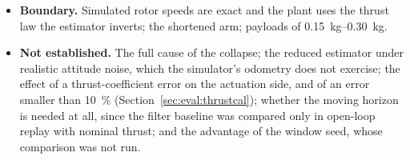 \begin{spacing}{1.5}
\begin{itemize}
estimate spent a median \SI{22}{\percent} of the loaded figure-eight below half
the payload and the reduced estimate none, in any flight. The median solve time
fell from \SI{2.8}{\milli\second} to \SI{0.3}{\milli\second}. Tracking and the
lifecycle did not change. In replay on the $48$ reduced-estimator flights, the
extended Kalman filter came within \SI{0.2}{\gram} of the reduced estimator's loaded
mass error, converging \SI{0.5}{\second} later after lift-off and
\SI{0.4}{\second} sooner after detachment; the window force balance was
\SIrange{0.5}{1.6}{\gram} less accurate. Penalising the newest measurement, which
the flown estimator leaves without cost, shortened its convergence by
\SIrange{0.2}{0.3}{\second} at unchanged accuracy, and replacing the body-origin
velocity by the composite-centre velocity changed nothing
(Section~\ref{sec:eval:reduced}).
\item \textbf{Boundary.} Simulated rotor speeds are exact and the plant uses the
thrust law the estimator inverts; the shortened arm; payloads of
\SIrange{0.15}{0.30}{\kg}.
\item \textbf{Not established.} The full cause of the collapse; the reduced
estimator under realistic attitude noise, which the simulator's odometry does not
exercise; the effect of a thrust-coefficient error on the actuation side, and of
an error smaller than \SI{10}{\percent} (Section~\ref{sec:eval:thrustcal});
whether the moving horizon is needed at all, since the filter baseline was
compared only in open-loop replay with nominal thrust; and the advantage of the
window seed, whose comparison was not run.
\end{itemize}


\end{spacing}
